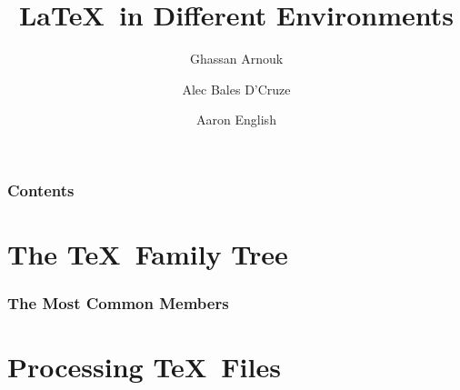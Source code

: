 \documentclass{beamer}
\title{\LaTeX~in Different Environments}
\author{Ghassan Arnouk \and
            Alec Bales D'Cruze \and
            Aaron English}
\begin{document}
    \begin{frame}
        \titlepage
    \end{frame}
    \begin{frame}
        \frametitle{Contents}
        \tableofcontents
    \end{frame}
    \section{The \TeX~Family Tree}
        \begin{frame}
            \frametitle{The Most Common Members}
            
        \end{frame}
    \section{Processing \TeX~Files}
\end{document}
